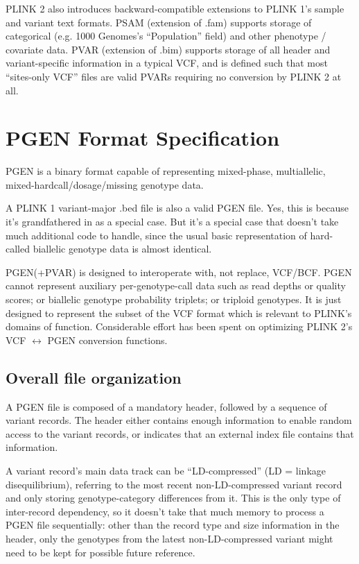 \documentclass[8pt]{article}
\begin{document}
PLINK 2 also introduces backward-compatible extensions to PLINK 1's sample and
variant text formats.  PSAM (extension of .fam) supports storage of categorical
(e.g. 1000 Genomes's ``Population'' field) and other phenotype / covariate
data.  PVAR (extension of .bim) supports storage of all header and
variant-specific information in a typical VCF, and is defined such that most
``sites-only VCF'' files are valid PVARs requiring no conversion by PLINK 2 at
all.

\newpage
\section{PGEN Format Specification}

PGEN is a binary format capable of representing mixed-phase, multiallelic,
mixed-hardcall/dosage/missing genotype data.

A PLINK 1 variant-major .bed file is also a valid PGEN file.  Yes, this is
because it's grandfathered in as a special case.  But it's a special case that
doesn't take much additional code to handle, since the usual basic
representation of hard-called biallelic genotype data is almost identical.

PGEN(+PVAR) is designed to interoperate with, not replace, VCF/BCF.  PGEN
cannot represent auxiliary per-genotype-call data such as read depths or
quality scores; or biallelic genotype probability triplets; or triploid
genotypes.  It is just designed to represent the subset of the VCF format which
is relevant to PLINK's domains of function.  Considerable effort has been spent
on optimizing PLINK 2's VCF $\leftrightarrow$ PGEN conversion functions.

\subsection{Overall file organization}

A PGEN file is composed of a mandatory header, followed by a sequence of
variant records.  The header either contains enough information to enable
random access to the variant records, or indicates that an external index file
contains that information.

A variant record's main data track can be ``LD-compressed'' (LD = linkage
disequilibrium), referring to the most recent non-LD-compressed variant record
and only storing genotype-category differences from it.  This is the only type
of inter-record dependency, so it doesn't take that much memory to process a
PGEN file sequentially: other than the record type and size information in the
header, only the genotypes from the latest non-LD-compressed variant might need
to be kept for possible future reference.
\end{document}

